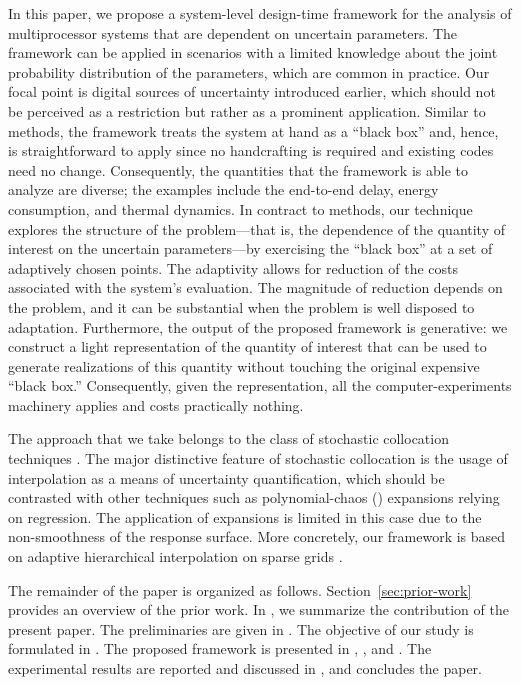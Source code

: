 In this paper, we propose a system-level design-time framework for the analysis
of multiprocessor systems that are dependent on uncertain parameters. The
framework can be applied in scenarios with a limited knowledge about the joint
probability distribution of the parameters, which are common in practice. Our
focal point is digital sources of uncertainty introduced earlier, which should
not be perceived as a restriction but rather as a prominent application. Similar
to  methods, the framework treats the system at hand as a ``black box''
and, hence, is straightforward to apply since no handcrafting is required and
existing codes need no change. Consequently, the quantities that the framework
is able to analyze are diverse; the examples include the end-to-end delay,
energy consumption, and thermal dynamics. In contract to  methods, our
technique explores the structure of the problem---that is, the dependence of the
quantity of interest on the uncertain parameters---by exercising the ``black
box'' at a set of adaptively chosen points. The adaptivity allows for reduction
of the costs associated with the system's evaluation. The magnitude of reduction
depends on the problem, and it can be substantial when the problem is well
disposed to adaptation. Furthermore, the output of the proposed framework is
generative: we construct a light representation of the quantity of interest that
can be used to generate realizations of this quantity without touching the
original expensive ``black box.'' Consequently, given the representation, all
the computer-experiments machinery applies and costs practically nothing.


The approach that we take belongs to the class of stochastic collocation
techniques \cite{xiu2010}. The major distinctive feature of stochastic
collocation is the usage of interpolation as a means of uncertainty
quantification, which should be contrasted with other techniques such as
polynomial-chaos () expansions relying on regression. The application
of  expansions is limited in this case due to the non-smoothness of the
response surface. More concretely, our framework is based on adaptive
hierarchical interpolation on sparse grids \cite{klimke2006, ma2009}.

The remainder of the paper is organized as follows. Section~\ref{sec:prior-work}
provides an overview of the prior work. In , we summarize the
contribution of the present paper. The preliminaries are given in
. The objective of our study is formulated in
. The proposed framework is presented in
, , and . The experimental
results are reported and discussed in , and
 concludes the paper.
